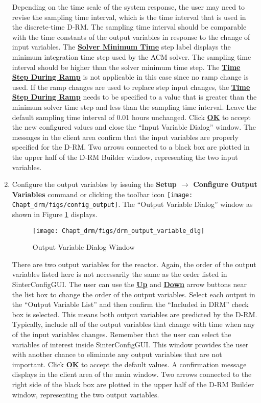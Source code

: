 \begin{enumerate}
	Depending on the time scale of the system response, the user may need to revise the sampling time interval, which is the time interval that is used in the discrete-time D-RM.  The sampling time interval should be comparable with the time constants of the output variables in response to the change of input variables.  The \textbf{\underline{Solver Minimum Time}} step label displays the minimum integration time step used by the ACM solver.  The sampling time interval should be higher than the solver minimum time step.  The \textbf{\underline{Time Step During Ramp}} is not applicable in this case since no ramp change is used.  If the ramp changes are used to replace step input changes, the \textbf{\underline{Time Step During Ramp}} needs to be specified to a value that is greater than the minimum solver time step and less than the sampling time interval.  Leave the default sampling time interval of 0.01 hours unchanged.  Click \textbf{\underline{OK}} to accept the new configured values and close the ``Input Variable Dialog'' window.  The messages in the client area confirm that the input variables are properly specified for the D-RM.  Two arrows connected to a black box are plotted in the upper half of the D-RM Builder window, representing the two input variables.
	\item Configure the output variables by issuing the \textbf{Setup $\rightarrow$ Configure Output Variables} command or clicking the toolbar icon \texttt{[image: Chapt\_drm/figs/config\_output]}.  The ``Output Variable Dialog'' window as shown in Figure \ref{fig.drm_output_variable_dlg} displays.  
	\begin{figure}[H]
		\begin{center}
			\texttt{[image: Chapt\_drm/figs/drm\_output\_variable\_dlg]}
			\caption{Output Variable Dialog Window}
			\label{fig.drm_output_variable_dlg}
		\end{center}
	\end{figure}
	There are two output variables for the reactor.  Again, the order of the output variables listed here is not necessarily the same as the order listed in SinterConfigGUI.  The user can use the \textbf{\underline{Up}} and \textbf{\underline{Down}} arrow buttons near the list box to change the order of the output variables.  Select each output in the ``Output Variable List'' and then confirm the ``Included in DRM'' check box is selected.  This means both output variables are predicted by the D-RM.  Typically, include all of the output variables that change with time when any of the input variables changes.  Remember that the user can select the variables of interest inside SinterConfigGUI.  This window provides the user with another chance to eliminate any output variables that are not important.  Click \textbf{\underline{OK}} to accept the default values.  A confirmation message displays in the client area of the main window.  Two arrows connected to the right side of the black box are plotted in the upper half of the D-RM Builder window, representing the two output variables.

\end{enumerate}

